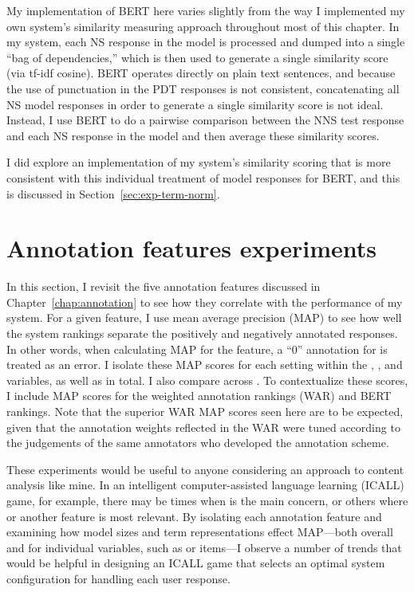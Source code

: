 My implementation of BERT here varies slightly from the way I implemented my own system's similarity measuring approach throughout most of this chapter. In my system, each NS response in the model is processed and dumped into a single ``bag of dependencies,'' which is then used to generate a single similarity score (via tf-idf cosine). BERT operates directly on plain text sentences, and because the use of punctuation in the PDT responses is not consistent, concatenating all NS model responses in order to generate a single similarity score is not ideal. Instead, I use BERT to do a pairwise comparison between the NNS test response and each NS response in the model and then average these similarity scores.

I did explore an implementation of my system's similarity scoring that is more consistent with this individual treatment of model responses for BERT, and this is discussed in Section~\ref{sec:exp-term-norm}.


\section{Annotation features experiments}
\label{sec:exp-annotations}
In this section, I revisit the five annotation features discussed in Chapter~\ref{chap:annotation} to see how they correlate with the performance of my system. For a given feature, I use mean average precision (MAP) to see how well the system rankings separate the positively and negatively annotated responses. In other words, when calculating MAP for the  feature, a ``0'' annotation for  is treated as an error. I isolate these MAP scores for each setting within the , , and  variables, as well as in total. I also compare across . To contextualize these scores, I include MAP scores for the weighted annotation rankings (WAR) and BERT rankings. Note that the superior WAR MAP scores seen here are to be expected, given that the annotation weights reflected in the WAR were tuned according to the judgements of the same annotators who developed the annotation scheme.

These experiments would be useful to anyone considering an approach to content analysis like mine. In an intelligent computer-assisted language learning (ICALL) game, for example, there may be times when  is the main concern, or others where  or another feature is most relevant. By isolating each annotation feature and examining how model sizes and term representations effect MAP---both overall and for individual variables, such as  or  items---I observe a number of trends that would be helpful in designing an ICALL game that selects an optimal system configuration for handling each user response.

